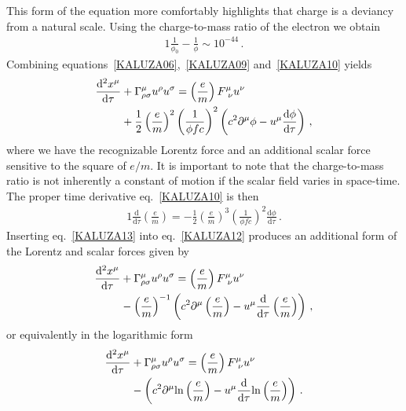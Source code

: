 This form of the equation more comfortably highlights that charge is a deviancy from a natural scale. Using the charge-to-mass ratio of the electron we obtain
\begin{alignat}{1}
	\label{eq:kkelectron} \frac{1}{\phi_0}-\frac{1}{\phi}\sim10^{-44}\,.
\end{alignat}
Combining equations~\eqref{KALUZA06},~\eqref{KALUZA09} and~\eqref{KALUZA10} yields
\begin{alignat}{1}
	\notag\frac{\mathrm{d}^{2}x^{\mu}}{\mathrm{d}\tau}&+\Gamma^{\mu}_{\rho\sigma}u^{\rho}u^{\sigma}=\left(\frac{e}{m}\right)F^{\mu}_{\ \nu}u^{\nu}\\
	\label{KALUZA12}&+\frac{1}{2}\left(\frac{e}{m}\right)^{2}\left(\frac{1}{\phi fc}\right)^{2}\left(c^{2}\partial^{\mu}\phi-u^{\mu}\frac{\mathrm{d}\phi}{\mathrm{d}\tau}\right)\,,
\end{alignat}
where we have the recognizable Lorentz force and an additional scalar force sensitive to the square of $e/m$. It is important to note that the charge-to-mass ratio is not inherently a constant of motion if the scalar field varies in space-time. The proper time derivative eq.~\eqref{KALUZA10} is then
\begin{alignat}{1}
	\label{KALUZA13} \frac{\mathrm{d}}{\mathrm{d}\tau}\left(\frac{e}{m}\right)=-\frac{1}{2}\left(\frac{e}{m}\right)^{3}\left(\frac{1}{\phi fc}\right)^{2}\frac{\mathrm{d}\phi}{\mathrm{d}\tau}\,.
\end{alignat}
Inserting eq.~\eqref{KALUZA13} into eq.~\eqref{KALUZA12} produces an additional form of the Lorentz and scalar forces given by
\begin{alignat}{1}
	\notag \frac{\mathrm{d}^{2}x^{\mu}}{\mathrm{d}\tau}&+\Gamma^{\mu}_{\rho\sigma}u^{\rho}u^{\sigma}=\left(\frac{e}{m}\right)F^{\mu}_{\ \nu}u^{\nu}\\
	\label{KALUZA14}&-\left(\frac{e}{m}\right)^{-1}\left(c^{2}\partial^{\mu}\left(\frac{e}{m}\right)-u^{\mu}\frac{\mathrm{d}}{\mathrm{d}\tau}\left(\frac{e}{m}\right)\right)\,,
\end{alignat}
or equivalently in the logarithmic form
\begin{alignat}{1}
	\notag \frac{\mathrm{d}^{2}x^{\mu}}{\mathrm{d}\tau}&+\Gamma^{\mu}_{\rho\sigma}u^{\rho}u^{\sigma}=\left(\frac{e}{m}\right)F^{\mu}_{\ \nu}u^{\nu}\\
	\label{eq:kklog}&-\left(c^{2}\partial^{\mu}\mathrm{ln}\left(\frac{e}{m}\right)-u^{\mu}\frac{\mathrm{d}}{\mathrm{d}\tau}\mathrm{ln}\left(\frac{e}{m}\right)\right)\,.
\end{alignat}

